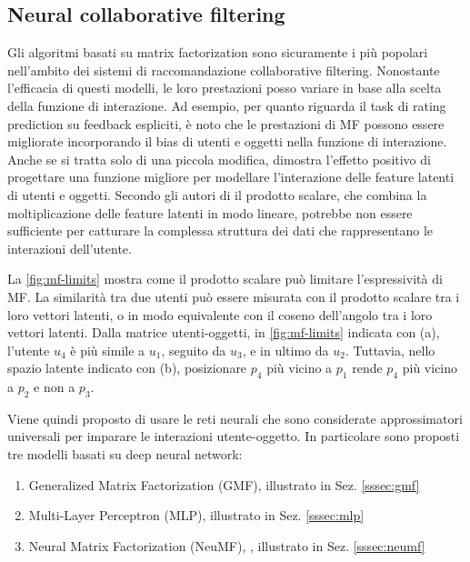 \documentclass[12pt,italian]{report}
\begin{document}
\subsection{Neural collaborative filtering} \label{subsec:ncf}
Gli algoritmi basati su matrix factorization sono sicuramente i più popolari nell'ambito dei sistemi di raccomandazione collaborative filtering. Nonostante l'efficacia di questi modelli, le loro prestazioni  posso variare in base alla scelta della funzione di interazione. Ad esempio, per quanto riguarda il task di rating prediction su feedback espliciti, è noto che le prestazioni di MF possono essere migliorate incorporando il bias di utenti e oggetti nella funzione di interazione. Anche se si tratta solo di una piccola modifica, dimostra l'effetto positivo di progettare una funzione migliore per modellare l'interazione delle feature latenti di utenti e oggetti. 
Secondo gli autori di \cite{NCF} il prodotto scalare, che combina la moltiplicazione delle feature latenti in modo lineare, potrebbe non essere sufficiente per catturare la complessa struttura dei dati che rappresentano le interazioni dell'utente. 

La \autoref{fig:mf-limits} mostra come il prodotto scalare può limitare l'espressività di MF. La similarità tra due utenti può essere misurata con il prodotto scalare tra i loro vettori latenti, o in modo equivalente con il coseno dell'angolo tra i loro vettori latenti. Dalla matrice utenti-oggetti, in \autoref{fig:mf-limits} indicata con (a), l'utente $u_4$ è più simile a $u_1$, seguito da $u_3$, e in ultimo da $u_2$. Tuttavia, nello spazio latente indicato con (b), posizionare $p_4$ più vicino a $p_1$ rende $p_4$ più vicino a $p_2$ e non a $p_3$.

Viene quindi proposto di usare le reti neurali che sono considerate approssimatori universali \cite{NN-universal-approx} per imparare le interazioni utente-oggetto. In particolare sono proposti tre modelli basati su deep neural network:
\begin{enumerate}
 \item Generalized Matrix Factorization (GMF), illustrato in Sez. \ref{sssec:gmf} 
 \item Multi-Layer Perceptron (MLP), illustrato in Sez. \ref{sssec:mlp} 
 \item Neural Matrix Factorization (NeuMF), , illustrato in Sez. \ref{sssec:neumf} 
\end{enumerate}
\end{document}
